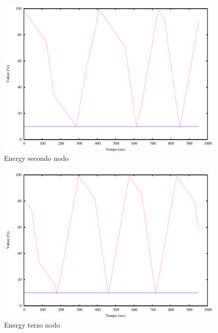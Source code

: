 \begin{figure}[H]
\begin{center}
\includegraphics[scale=0.6]{etc/energy2.pdf}
\caption{Energy secondo nodo}
\label{fig:energy2}
\end{center}
\end{figure}
\begin{figure}[H]
\begin{center}
\includegraphics[scale=0.6]{etc/energy3.pdf}
\caption{Energy terzo nodo}
\label{fig:energy3}
\end{center}
\end{figure}
